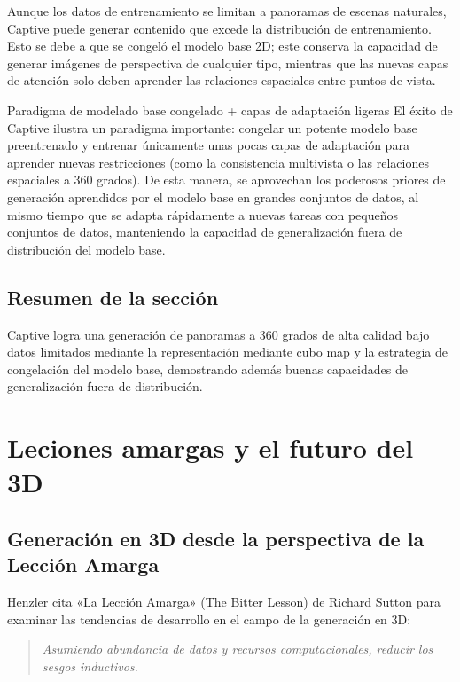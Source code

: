 \documentclass[a4paper]{article}
\begin{document}
Aunque los datos de entrenamiento se limitan a panoramas de escenas naturales, Captive puede generar contenido que excede la distribución de entrenamiento. Esto se debe a que se congeló el modelo base 2D; este conserva la capacidad de generar imágenes de perspectiva de cualquier tipo, mientras que las nuevas capas de atención solo deben aprender las relaciones espaciales entre puntos de vista.

\begin{knowledgebox}{Paradigma de modelado base congelado + capas de adaptación ligeras}
El éxito de Captive ilustra un paradigma importante: congelar un potente modelo base preentrenado y entrenar únicamente unas pocas capas de adaptación para aprender nuevas restricciones (como la consistencia multivista o las relaciones espaciales a 360 grados). De esta manera, se aprovechan los poderosos priores de generación aprendidos por el modelo base en grandes conjuntos de datos, al mismo tiempo que se adapta rápidamente a nuevas tareas con pequeños conjuntos de datos, manteniendo la capacidad de generalización fuera de distribución del modelo base.
\end{knowledgebox}

\subsection{Resumen de la sección}

Captive logra una generación de panoramas a 360 grados de alta calidad bajo datos limitados mediante la representación mediante cubo map y la estrategia de congelación del modelo base, demostrando además buenas capacidades de generalización fuera de distribución.
\section{Leciones amargas y el futuro del 3D}

\subsection{Generación en 3D desde la perspectiva de la Lección Amarga}

Henzler cita «La Lección Amarga» (The Bitter Lesson) de Richard Sutton para examinar las tendencias de desarrollo en el campo de la generación en 3D:

\begin{quote}
\textit{Asumiendo abundancia de datos y recursos computacionales, reducir los sesgos inductivos.}
\end{quote}
\end{document}
